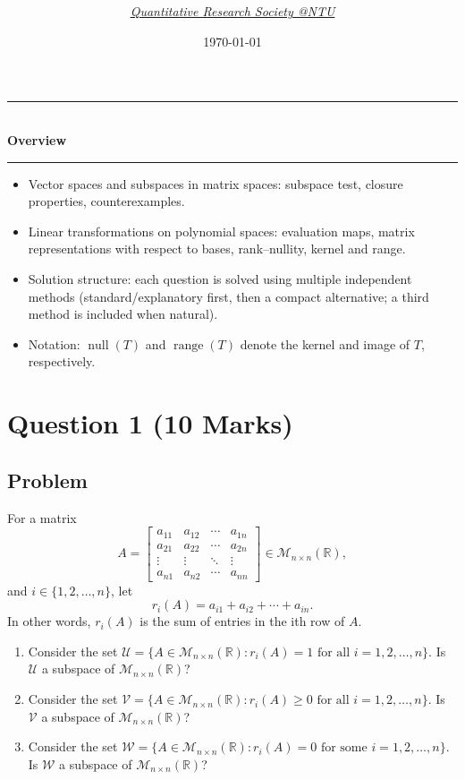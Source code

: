 \documentclass[12pt]{article}
\title{
\Huge \CourseCode\ \CourseName \\[0.3em]
\Large \DocType  \\[0.3em]
\large \ExamMeta
}
\author{
  \textit{\href{https://qrsntu.org}{Quantitative Research Society @NTU}}
}
\date{\today}
\newenvironment{overview}{
  \par\bigskip
  \begin{center}
    \rule{0.92\linewidth}{0.6pt}\\[-0.2em]
    \textbf{Overview}\\[-0.2em]
    \rule{0.92\linewidth}{0.6pt}
  \end{center}
  \vspace{-0.3em}
  \begin{itemize}[leftmargin=1.6em, itemsep=0.2em, topsep=0.2em]
}{
  \end{itemize}
  \par\bigskip
}
\begin{document}
\maketitle
\thispagestyle{plainfirst}
\pagestyle{main}

\begin{overview}
  \item Vector spaces and subspaces in matrix spaces: subspace test, closure properties, counterexamples.
  \item Linear transformations on polynomial spaces: evaluation maps, matrix representations with respect to bases, rank--nullity, kernel and range.
  \item Solution structure: each question is solved using multiple independent methods (standard/explanatory first, then a compact alternative; a third method is included when natural).
  \item Notation: $\operatorname{null}(T)$ and $\operatorname{range}(T)$ denote the kernel and image of $T$, respectively.
\end{overview}


\newpage
\tableofcontents
\newpage

\section{Question 1 \hfill (10 Marks)}

\subsection{Problem}
For a matrix
\[
A=
\begin{bmatrix}
a_{11} & a_{12} & \cdots & a_{1n}\\
a_{21} & a_{22} & \cdots & a_{2n}\\
\vdots & \vdots & \ddots & \vdots\\
a_{n1} & a_{n2} & \cdots & a_{nn}
\end{bmatrix}
\in \mathcal{M}_{n\times n}(\mathbb{R}),
\]
and $i\in\{1,2,\ldots,n\}$, let
\[
r_i(A)=a_{i1}+a_{i2}+\cdots+a_{in}.
\]
In other words, $r_i(A)$ is the sum of entries in the ith row of $A$.

\begin{enumerate}[label=(\alph*)]
\item Consider the set $\mathcal{U}=\{A\in \mathcal{M}_{n\times n}(\mathbb{R}): r_i(A)=1\text{ for all } i=1,2,\ldots,n\}$. Is $\mathcal{U}$ a subspace of $\mathcal{M}_{n\times n}(\mathbb{R})$?
\item Consider the set $\mathcal{V}=\{A\in \mathcal{M}_{n\times n}(\mathbb{R}): r_i(A)\ge 0\text{ for all } i=1,2,\ldots,n\}$. Is $\mathcal{V}$ a subspace of $\mathcal{M}_{n\times n}(\mathbb{R})$?
\item Consider the set $\mathcal{W}=\{A\in \mathcal{M}_{n\times n}(\mathbb{R}): r_i(A)=0\text{ for some } i=1,2,\ldots,n\}$. Is $\mathcal{W}$ a subspace of $\mathcal{M}_{n\times n}(\mathbb{R})$?
\end{enumerate}
\end{document}

